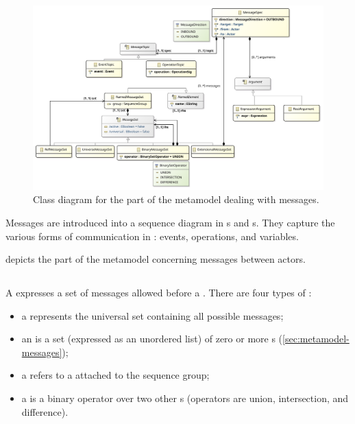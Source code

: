 \begin{figure}[htb]
	\centering
	\includegraphics[width=\textwidth]{diagrams/Messages}
	\caption{Class diagram for the part of the \langname{} metamodel dealing with messages.}
	\label{fig:metamodel-messages}
\end{figure}

\noindent
Messages are introduced into a sequence diagram
in \mmessageset s and \marrowaction s.  They capture the various forms of
communication in \robochart: events, operations, and 
variables.

 depicts the part of the metamodel concerning
messages between actors.

\subsection{\mmessageset}\label{ssec:metamodel-messages-sets}

A \mmessageset{} expresses a set of messages allowed 
before a \msequenceaction.  There are four types of \mmessageset:

\begin{itemize}
\item
  a \muniversemessageset{} represents the universal set containing 
  all possible messages;
\item	
  an \mextensionalmessageset{} is a set (expressed as an unordered list) of
  zero or more \mmessagespec s (\cref{sec:metamodel-messages});
\item
  a \mrefmessageset{} refers to a \mnamedmessageset{} attached to the
  sequence group;
\item
  a \mbinarymessageset{} is a binary operator over two other \mmessageset s
  (operators are union, intersection, and difference).
\end{itemize}

